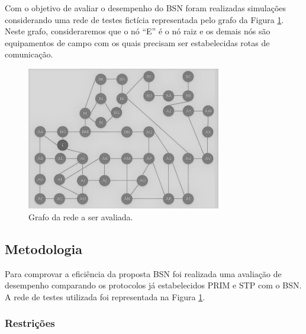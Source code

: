 \documentclass[12pt]{article}
\begin{document}
Com o objetivo de avaliar o desempenho do BSN foram realizadas simulações considerando uma rede de testes fictícia representada pelo grafo da Figura \ref{fig_rede_estudo}. Neste grafo, consideraremos que o nó ``E'' é o nó raiz e os demais nós são equipamentos de campo com os quais precisam ser estabelecidas rotas de comunicação.

\begin{figure} %
	\centering
	\includegraphics[width=8.5cm]{Rede_Estudo_PB}
	\caption{Grafo da rede a ser avaliada.}
	\label{fig_rede_estudo}
\end{figure}

\subsection{Metodologia}

Para comprovar a eficiência da proposta BSN foi realizada uma avaliação de desempenho comparando os protocolos já estabelecidos PRIM e STP com o BSN. A rede de testes utilizada foi representada na Figura \ref{fig_rede_estudo}.

\subsubsection{Restrições}
\end{document}
